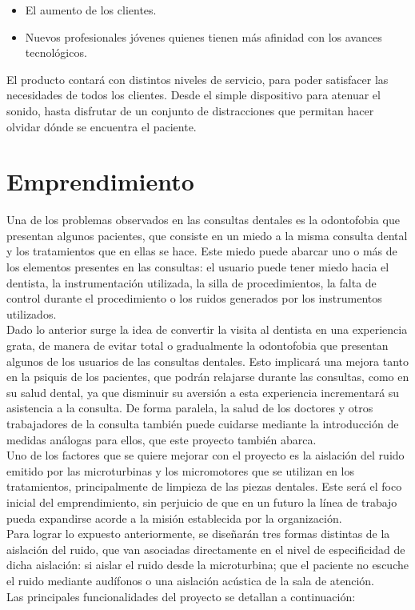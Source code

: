 \documentclass[letterpaper,12pt]{article}
\begin{document}
	\begin{itemize}
		\setlength{\itemsep}{0pt}%
		\setlength{\parskip}{0pt}%
		\item El aumento de los clientes.
		\item Nuevos profesionales jóvenes quienes tienen más afinidad con los avances tecnológicos.
	\end{itemize}

\indent El producto contará con distintos niveles de servicio, para poder satisfacer las necesidades de todos los clientes. 
Desde el simple dispositivo para atenuar el sonido, hasta disfrutar de un conjunto de distracciones que permitan hacer olvidar dónde se encuentra el paciente.

	\newpage
	\tableofcontents
	\newpage

\section{Emprendimiento}
Una de los problemas observados en las consultas dentales es la odontofobia que presentan 
algunos pacientes, que consiste en un miedo a la misma consulta dental y los tratamientos que en 
ellas se hace. Este miedo puede abarcar uno o más de los elementos presentes en las consultas: el 
usuario puede tener miedo hacia el dentista, la instrumentación utilizada, la silla de procedimientos, 
la falta de control durante el procedimiento o los ruidos generados por los instrumentos utilizados.
\\[0.5cm]
\indent Dado lo anterior surge la idea de convertir la visita al dentista en una experiencia grata, de manera de evitar total o gradualmente la odontofobia que presentan algunos de los usuarios de las 
consultas dentales. Esto implicará una mejora tanto en la psiquis de los pacientes, que podrán 
relajarse durante las consultas, como en su salud dental, ya que disminuir su aversión a esta 
experiencia incrementará su asistencia a la consulta. De forma paralela, la salud de los doctores y 
otros trabajadores de la consulta también puede cuidarse mediante la introducción de medidas 
análogas para ellos, que este proyecto también abarca.
\\[0.5cm]
\indent Uno de los factores que se quiere mejorar con el proyecto es la aislación del ruido emitido por las microturbinas y los micromotores que se utilizan en los tratamientos, principalmente de limpieza de las piezas dentales. Este será el foco inicial del emprendimiento, sin perjuicio de que en un futuro la línea de trabajo pueda expandirse acorde a la misión establecida por la organización.
\\[0.5cm]
\indent Para lograr lo expuesto anteriormente, se diseñarán tres formas distintas de la aislación del ruido, que van asociadas directamente en el nivel de especificidad de dicha aislación: si aislar el ruido desde la microturbina; que el paciente no escuche el ruido mediante audífonos o una aislación acústica de la sala de atención.
\\[0.5cm]
\indent Las principales funcionalidades del proyecto se detallan a continuación:
\end{document}
